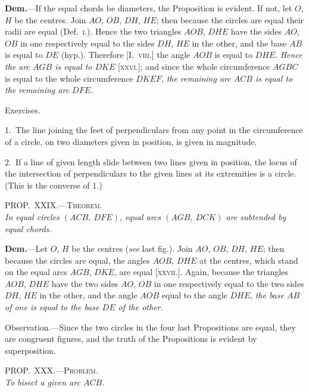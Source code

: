 \documentclass[oneside]{book}
\newcommand\myprop[2]{
\bigskip\Needspace*{4\baselineskip}\begin{center}\textsc{#1}\\\medskip\emph{#2}\par\end{center}
}
\newcommand\exhead[1]{
\Needspace*{5\baselineskip}\begin{center}
\textsf{#1}
\end{center}
}
\begin{document}
\textbf{Dem.}---If the equal chords be diameters, the Proposition
is evident. If
not, let $O$, $H$ be the
centres. Join $AO$,
$OB$, $DH$, $HE$; then
because the circles
are equal their radii
are equal (Def.~\textsc{i.}).
Hence the two triangles
$AOB$, $DHE$
have the sides $AO$, $OB$ in one respectively equal to
the sides $DH$, $HE$ in the other, and the base $AB$ is
equal to $DE$ (hyp.). Therefore [I.~\textsc{viii.}] the angle
$AOB$ is equal to $DHE$. \emph{Hence the arc $AGB$ is equal
to $DKE$} [\textsc{xxvi.}]; and since the whole circumference
$AGBC$ is equal to the whole circumference $DKEF$,
\emph{the remaining arc $ACB$ is equal to the remaining arc
$DFE$.}

\exhead{Exercises.}

\begin{footnotesize}
1.~The line joining the feet of perpendiculars from any point
in the circumference of a circle, on two diameters given in position,
is given in magnitude.

2.~If a line of given length slide between two lines given in
position, the locus of the intersection of perpendiculars to the
given lines at its extremities is a circle. (This is the converse
of 1.)
\par\end{footnotesize}

\myprop{PROP\@.~XXIX\@.---Theorem.}{In equal circles $(ACB,\ DFE)$, equal arcs $(AGB,\ DCK)$
are subtended by equal chords.}

\textbf{Dem.}---Let $O$, $H$ be the centres (\emph{see} last fig.). Join
$AO$, $OB$, $DH$, $HE$; then because the circles are equal,
the angles $AOB$, $DHE$ at the centres, which stand on
the equal arcs $AGB$, $DKE$, are equal [\textsc{xxvii.}]. Again,
because the triangles $AOB$, $DHE$ have the two sides
$AO$, $OB$ in one respectively equal to the two sides $DH$,
$HE$ in the other, and the angle $AOB$ equal to the angle
$DHE$, \emph{the base $AB$ of one is equal to the base $DE$ of the
other.}\par\medskip

\begin{footnotesize}
\textsf{Observation.}---Since the two circles in the four last Propositions
are equal, they are congruent figures, and the truth of the
Propositions is evident by superposition.
\par\end{footnotesize}

\myprop{PROP\@.~XXX\@.---Problem.}{To bisect a given arc $ACB$.}
\end{document}
